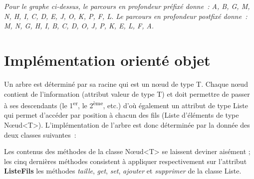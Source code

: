 			{\itshape
			Pour le graphe ci-dessus, le parcours en profondeur préfixé donne~: 
			A, B, G, M, N, H, I, C, D, E, J, O, K, P, F, L. 
			Le parcours en profondeur postfixé donne~: 
			M, N, G, H, I, B, C, D, O, J, P, K, E, L, F, A.}
			

\section{Implémentation orienté objet}

	Un arbre est déterminé par sa racine qui est un n{\oe}ud de type T. 
	Chaque n{\oe}ud contient de l'information (attribut
	valeur de type T) et doit permettre de passer à ses 
	descendants (le 1\textsuperscript{er}, le 2\textsuperscript{ème},
	etc.) d'où également un attribut de type Liste qui permet 
	d'accéder par position à chacun des fils (Liste d'éléments de
	type N{\oe}ud<T>). L'implémentation de l'arbre est donc 
	déterminée par la donnée des deux classes suivantes~: 
	
	

	Les contenus des méthodes de la classe N{\oe}ud<T> se laissent 
	deviner aisément ; les cinq dernières méthodes consistent à appliquer 
	respectivement sur l'attribut \textbf{ListeFils} 
	les méthodes \textit{taille}, \textit{get}, \textit{set}, 
	\textit{ajouter} et \textit{supprimer} de la classe Liste.


